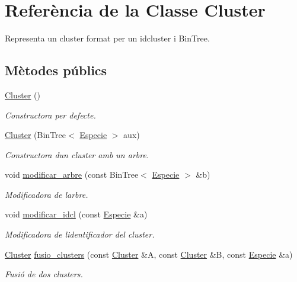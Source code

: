 \hypertarget{class_cluster}{}\section{Referència de la Classe Cluster}
\label{class_cluster}


Representa un cluster format per un idcluster i Bin\+Tree.  


\subsection*{Mètodes públics}
\begin{DoxyCompactItemize}
\item 
\hyperlink{class_cluster_aee7feb1d599d4c8fda6c3ee83e86ba81}{Cluster} ()
\begin{DoxyCompactList}\small\item\em Constructora per defecte. \end{DoxyCompactList}\item 
\hyperlink{class_cluster_a2559ebf853192492bcae2cd68f54e5a7}{Cluster} (Bin\+Tree$<$ \hyperlink{class_especie}{Especie} $>$ aux)
\begin{DoxyCompactList}\small\item\em Constructora d\textquotesingle{}un cluster amb un arbre. \end{DoxyCompactList}\item 
void \hyperlink{class_cluster_a9707363e42b561a69da942006e046773}{modificar\+\_\+arbre} (const Bin\+Tree$<$ \hyperlink{class_especie}{Especie} $>$ \&b)
\begin{DoxyCompactList}\small\item\em Modificadora de l\textquotesingle{}arbre. \end{DoxyCompactList}\item 
void \hyperlink{class_cluster_a7eed2fbce7f913320f5aaadc4ce9a4bc}{modificar\+\_\+idcl} (const \hyperlink{class_especie}{Especie} \&a)
\begin{DoxyCompactList}\small\item\em Modificadora de l\textquotesingle{}identificador del cluster. \end{DoxyCompactList}\item 
\hyperlink{class_cluster}{Cluster} \hyperlink{class_cluster_aeabe2287a82148281582a77f04ca6977}{fusio\+\_\+clusters} (const \hyperlink{class_cluster}{Cluster} \&A, const \hyperlink{class_cluster}{Cluster} \&B, const \hyperlink{class_especie}{Especie} \&a)
\begin{DoxyCompactList}\small\item\em Fusió de dos clusters. \end{DoxyCompactList}\item 

\end{DoxyCompactItemize}
